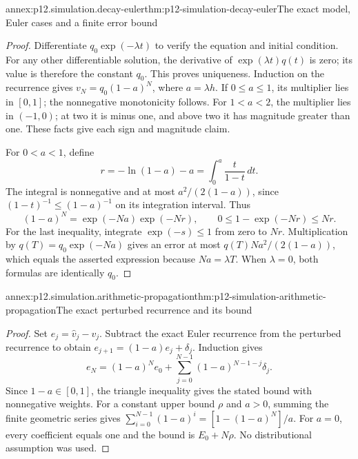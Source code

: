 \begin{annexitem}{annex:p12.simulation.decay-euler}{thm:p12-simulation-decay-euler}{The exact model, Euler cases and a finite error bound}
\begin{proof}
Differentiate \(q_0\exp(-\lambda t)\) to verify the equation and
initial condition. For any other differentiable solution, the
derivative of \(\exp(\lambda t)q(t)\) is zero; its value is
therefore the constant \(q_0\). This proves uniqueness.
Induction on the recurrence gives \(v_N=q_0(1-a)^N\), where
\(a=\lambda h\). If \(0\leq a\leq1\), its multiplier lies
in \([0,1]\); the nonnegative monotonicity follows. For
\(1<a<2\), the multiplier lies in \((-1,0)\); at two it is
minus one, and above two it has magnitude greater than one.
These facts give each sign and magnitude claim.

For \(0<a<1\), define
\[
 r=-\ln(1-a)-a=\int_0^a\frac{t}{1-t}\,dt.
\]
The integral is nonnegative and at most
\(a^2/(2(1-a))\), since \((1-t)^{-1}\leq(1-a)^{-1}\)
on its integration interval. Thus
\[
 (1-a)^N=\exp(-Na)\exp(-Nr),\qquad
 0\leq1-\exp(-Nr)\leq Nr.
\]
For the last inequality, integrate \(\exp(-s)\leq1\) from
zero to \(Nr\). Multiplication by \(q(T)=q_0\exp(-Na)\)
gives an error at most \(q(T)Na^2/(2(1-a))\), which equals
the asserted expression because \(Na=\lambda T\).
When \(\lambda=0\), both formulas are identically \(q_0\).
\end{proof}
\end{annexitem}

\begin{annexitem}{annex:p12.simulation.arithmetic-propagation}{thm:p12-simulation-arithmetic-propagation}{The exact perturbed recurrence and its bound}
\begin{proof}
Set \(e_j=\widehat v_j-v_j\). Subtract the exact Euler recurrence
from the perturbed recurrence to obtain
\(e_{j+1}=(1-a)e_j+\delta_j\). Induction gives
\[
 e_N=(1-a)^Ne_0+\sum_{j=0}^{N-1}(1-a)^{N-1-j}\delta_j.
\]
Since \(1-a\in[0,1]\), the triangle inequality gives the stated
bound with nonnegative weights. For a constant upper bound \(\rho\)
and \(a>0\), summing the finite geometric series gives
\(\sum_{i=0}^{N-1}(1-a)^i=[1-(1-a)^N]/a\).
For \(a=0\), every coefficient equals one and the bound is
\(E_0+N\rho\). No distributional assumption was used.
\end{proof}
\end{annexitem}

